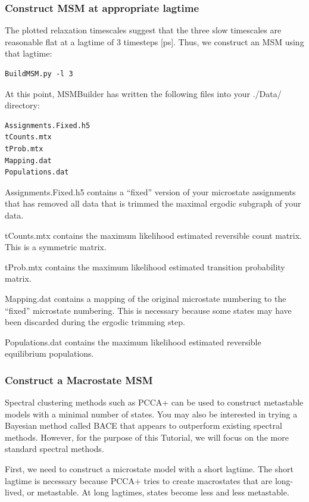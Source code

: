 \documentclass[12pt]{article}
\begin{document}
\subsubsection{Construct MSM at appropriate lagtime}
The plotted relaxation timescales suggest that the three slow timescales are reasonable flat at a lagtime of 3 timesteps [ps].  Thus, we construct an MSM using that lagtime:

\begin{verbatim}
BuildMSM.py -l 3 
\end{verbatim}

At this point, MSMBuilder has written the following files into your ./Data/ directory:
\begin{verbatim}
Assignments.Fixed.h5
tCounts.mtx
tProb.mtx
Mapping.dat
Populations.dat
\end{verbatim}

Assignments.Fixed.h5 contains a “fixed” version of your microstate assignments that has removed all data that is trimmed the maximal ergodic subgraph of your data.  

tCounts.mtx contains the maximum likelihood estimated reversible count matrix.  This is a symmetric matrix.  

tProb.mtx contains the maximum likelihood estimated transition probability matrix.  

Mapping.dat contains a mapping of the original microstate numbering to the “fixed” microstate numbering.  This is necessary because some states may have been discarded during the ergodic trimming step.  

Populations.dat contains the maximum likelihood estimated reversible equilibrium populations.  

\subsubsection{Construct a Macrostate MSM}

Spectral clustering methods such as PCCA+  \cite{Deuflhard2000, Deuflhard2005, kube2007coarse} can be used to construct metastable models with a minimal number of states.  You may also be interested in trying a Bayesian method called BACE \cite{Bowman2012} that appears to outperform existing spectral methods.  However, for the purpose of this Tutorial, we will focus on the more standard spectral methods.

First, we need to construct a microstate model with a short lagtime.  The short lagtime is necessary because PCCA+ tries to create macrostates that are long-lived, or metastable.  At long lagtimes, states become less and less metastable.
\end{document}
